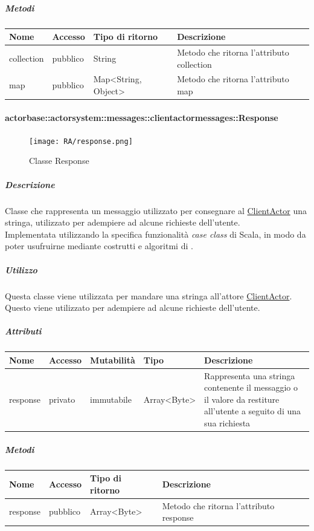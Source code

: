 \documentclass{scalatekids-article}
\begin{document}
\subparagraph{Metodi}
\begin{tabular}{| l | l | l | l |}
  \hline
  Nome & Accesso & Tipo di ritorno & Descrizione\\
  \hline
  collection & pubblico & String & Metodo che ritorna l'attributo collection\\
  \hline
  map & pubblico & Map<String, Object> & Metodo che ritorna l'attributo map\\
  \hline
\end{tabular}

\paragraph{actorbase::actorsystem::messages::clientactormessages::Response}
\label{sec:actorbase::actorsystem::messages::clientactormessages::Response}

\begin{figure}[H]
  \begin{center}
    \texttt{[image: RA/response.png]}
    \caption{Classe Response}
  \end{center}
\end{figure}

\subparagraph{Descrizione}
Classe che rappresenta un messaggio utilizzato per consegnare al
\hyperref[sec:actorbase::actorsystem::actors::clientactor::ClientActor]{ClientActor} una stringa, utilizzato per adempiere ad alcune
richieste dell'utente.\\Implementata utilizzando la specifica funzionalità \textit{case class} di Scala,
in modo da poter usufruirne mediante costrutti e algoritmi di
.

\subparagraph{Utilizzo}
Questa classe viene utilizzata per mandare una stringa all'attore
\hyperref[sec:actorbase::actorsystem::actors::clientactor::ClientActor]{ClientActor}.
Questo viene utilizzato per adempiere ad alcune richieste dell'utente.

\subparagraph{Attributi}
\begin{tabular}{| p{2cm} | p{1.5cm} | p{2cm} | p{3cm} | p{8.5cm} |}
  \hline
  Nome & Accesso & Mutabilità & Tipo & Descrizione\\
  \hline
  response & privato & immutabile & Array<Byte> & Rappresenta una stringa contenente il messaggio o il valore da restiture all'utente a seguito di una sua richiesta\\
  \hline
\end{tabular}

\subparagraph{Metodi}
\begin{tabular}{| l | l | l | l |}
  \hline
  Nome & Accesso & Tipo di ritorno & Descrizione\\
  \hline
  response & pubblico & Array<Byte> & Metodo che ritorna l'attributo response\\
  \hline
\end{tabular}
\end{document}
